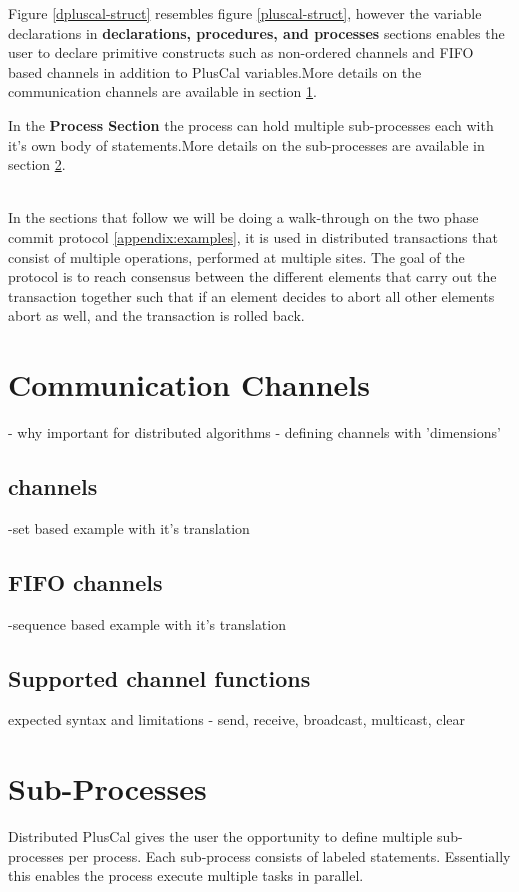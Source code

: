 \documentclass{thesul}
\begin{document}
Figure \ref{dpluscal-struct} resembles figure \ref{pluscal-struct}, however the variable declarations in \textbf{declarations, procedures, and processes} sections enables the user to declare primitive constructs such as non-ordered channels and FIFO based channels in addition to PlusCal variables.More details on the communication channels are available in section \ref{comChannels}.

In the \textbf{Process Section} the process can hold multiple sub-processes each with it's own body of statements.More details on the sub-processes are available in section \ref{subProcess}.


\hfill\\
In the sections that follow we will be doing a walk-through on the two phase commit protocol \ref{appendix:examples}, it is used in distributed transactions that consist of multiple operations, performed at multiple sites. The goal of the protocol is to reach consensus between the different elements that carry out the transaction together such that if an element decides to abort all other elements abort as well, and the transaction is rolled back.

\section{Communication Channels}
\label{comChannels}

- why important for distributed algorithms
- defining channels with 'dimensions'
\subsection{channels}
-set based 
example with it's translation
\subsection{FIFO channels}
-sequence based
example with it's translation
\subsection{Supported channel functions}
expected syntax and limitations
- send, receive, broadcast, multicast, clear
\section{Sub-Processes}
\label{subProcess}

Distributed PlusCal gives the user the opportunity to define multiple sub-processes per process. Each sub-process consists of labeled statements. Essentially this enables the process execute multiple tasks in parallel.
\end{document}

